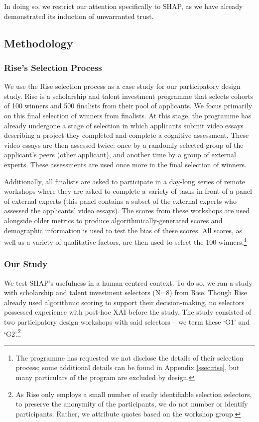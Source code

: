 \noindent In doing so, we restrict our attention specifically to SHAP, as we have already demonstrated its induction of unwarranted trust.

\subsection{Methodology}\label{ssec:cs_methods}
\subsubsection{Rise's Selection Process}
We use the Rise selection process as a case study for our participatory design study. Rise is a scholarship and talent investment programme that selects cohorts of 100 winners and 500 finalists from their pool of applicants. We focus primarily on this final selection of winners from finalists. At this stage, the programme has already undergone a stage of selection in which applicants submit video essays describing a project they completed 
and complete a cognitive assessment. These video essays are then assessed twice: once by a randomly selected group of the applicant's peers (other applicant), and another time by a group of external experts. These assessments are used once more in the final selection of winners.

Additionally, all finalists are asked to participate in a day-long series of remote workshops where they are asked to complete a variety of tasks in front of a panel of external experts (this panel contains a subset of the external experts who assessed the applicants' video essays). The scores from these workshops are used alongside older metrics to produce algorithmically-generated scores and demographic information is used to test the bias of these scores. All scores, as well as a variety of qualitative factors, are then used to select the 100 winners.\footnote{The programme has requested we not disclose the details of their selection process; some additional details can be found in Appendix \ref{ssec:rise}, but many particulars of the program are excluded by design.}

\subsubsection{Our Study}
We test SHAP's usefulness in a human-centred context. To do so, we ran a study with scholarship and talent investment selectors (N=8) from Rise. Though Rise already used algorithmic scoring to support their decision-making, no selectors possessed experience with post-hoc XAI before the study. The study consisted of two participatory design workshops with said selectors – we term these `G1' and `G2'.\footnote{As Rise only employs a small number of easily identifiable selection selectors, to preserve the anonymity of the participants, we do not number or identify participants. Rather, we attribute quotes based on the workshop group.}

